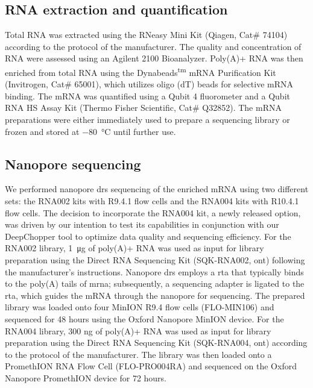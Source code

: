 \documentclass[pdflatex,sn-nature, lineno]{sn-jnl}%
\begin{document}
\subsection{RNA extraction and quantification}

Total RNA was extracted using the RNeasy Mini Kit (Qiagen, Cat\# 74104) according to the protocol of the manufacturer.
The quality and concentration of RNA were assessed using an Agilent 2100 Bioanalyzer.
Poly(A)+ RNA was then enriched from total RNA using the Dynabeads\textsuperscript{tm} mRNA Purification Kit (Invitrogen, Cat\# 65001), which utilizes oligo (dT) beads for selective mRNA binding.
The mRNA was quantified using a Qubit 4 fluorometer and a Qubit RNA HS Assay Kit (Thermo Fisher Scientific, Cat\# Q32852).
The mRNA preparations were either immediately used to prepare a sequencing library or frozen and stored at \SI{-80}{\degreeCelsius} until further use.

\subsection{Nanopore sequencing}

We performed nanopore \gls{drs} sequencing of the enriched mRNA using two different sets: the RNA002 kits with R9.4.1 flow cells and the RNA004 kits with R10.4.1 flow cells.
The decision to incorporate the RNA004 kit, a newly released option, was driven by our intention to test its capabilities in conjunction with our DeepChopper tool to optimize data quality and sequencing efficiency.
For the RNA002 library, \SI{1}{\micro\gram} of poly(A)+ RNA was used as input for library preparation using the Direct RNA Sequencing Kit (SQK-RNA002, \gls{ont}) following the manufacturer's instructions.
Nanopore \gls{drs} employs a \gls{rta} that typically binds to the poly(A) tails of \gls{mrna}; subsequently, a sequencing adapter is ligated to the \gls{rta}, which guides the mRNA through the nanopore for sequencing.
The prepared library was loaded onto four MinION R9.4 flow cells (FLO-MIN106) and sequenced for 48 hours using the Oxford Nanopore MinION device.
For the RNA004 library, 300 ng of poly(A)+ RNA was used as input for library preparation using the Direct RNA Sequencing Kit (SQK-RNA004, \gls{ont}) according to the protocol of the manufacturer.
The library was then loaded onto a PromethION RNA Flow Cell (FLO-PRO004RA) and sequenced on the Oxford Nanopore PromethION device for 72 hours.
\end{document}
